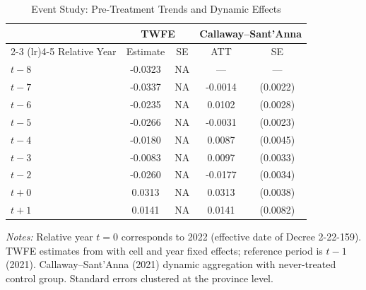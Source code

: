\begin{table}[H]
\centering
\caption{Event Study: Pre-Treatment Trends and Dynamic Effects}
\begin{threeparttable}
\begin{tabular}{lcccc}
\toprule
 & \multicolumn{2}{c}{TWFE} & \multicolumn{2}{c}{Callaway--Sant'Anna} \\
\cmidrule(lr){2-3} \cmidrule(lr){4-5}
Relative Year & Estimate & SE & ATT & SE \\
\midrule
$t -8$ & -0.0323 & NA & --- & --- \\
$t -7$ & -0.0337 & NA & -0.0014 & (0.0022) \\
$t -6$ & -0.0235 & NA & 0.0102 & (0.0028) \\
$t -5$ & -0.0266 & NA & -0.0031 & (0.0023) \\
$t -4$ & -0.0180 & NA & 0.0087 & (0.0045) \\
$t -3$ & -0.0083 & NA & 0.0097 & (0.0033) \\
$t -2$ & -0.0260 & NA & -0.0177 & (0.0034) \\
$t +0$ & 0.0313 & NA & 0.0313 & (0.0038) \\
$t +1$ & 0.0141 & NA & 0.0141 & (0.0082) \\
\bottomrule
\end{tabular}
\begin{tablenotes}[flushleft]
\small
\item \textit{Notes:} Relative year $t = 0$ corresponds to 2022 (effective date of Decree 2-22-159). 
TWFE estimates from  with cell and year fixed effects; 
reference period is $t - 1$ (2021). 
Callaway--Sant'Anna (2021) dynamic aggregation with never-treated control group. 
Standard errors clustered at the province level.
\end{tablenotes}
\end{threeparttable}
\label{tab:eventstudy}
\end{table}
